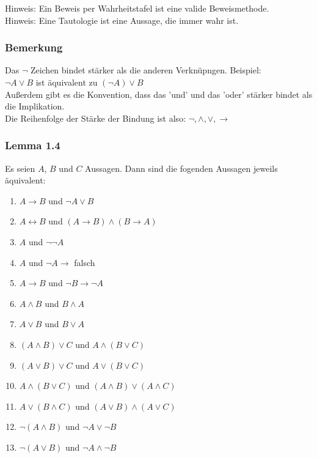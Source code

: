 \documentclass{article}
\begin{document}
Hinweis: Ein Beweis per Wahrheitstafel ist eine valide Beweismethode. \\
Hinweis: Eine Tautologie ist eine Aussage, die immer wahr ist. \\

\subsubsection*{Bemerkung}
Das $\neg$ Zeichen bindet stärker als die anderen Verknüpngen. Beispiel: \\
$\neg A \vee B$ ist äquivalent zu $(\neg A) \vee B$ \\
Außerdem gibt es die Konvention, dass das 'und' und das 'oder' stärker bindet als die Implikation. \\
Die Reihenfolge der Stärke der Bindung ist also: $\neg, \wedge, \vee, \rightarrow$ \\


\subsubsection*{Lemma 1.4}
Es seien $A$, $B$ und $C$ Aussagen. Dann sind die fogenden Aussagen jeweils äquivalent: \\
\begin{enumerate}
    \item $A \rightarrow B$ und $\neg A \vee B$
    \item $A \leftrightarrow B$ und $(A \rightarrow B) \wedge (B \rightarrow A)$
    \item $A$ und $\neg \neg A$
    \item $A$ und $\neg A \rightarrow $ falsch
    \item $A \rightarrow B$ und $\neg B \rightarrow \neg A$
    \item $A \wedge B$ und $B \wedge A$
    \item $A \vee B$ und $B \vee A$
    \item $(A \wedge B) \vee C$ und $A \wedge (B \vee C)$
    \item $(A \vee B) \vee C$ und $A \vee (B \vee C)$
    \item $A \wedge (B \vee C)$ und $(A \wedge B) \vee (A \wedge C)$
    \item $A \vee (B \wedge C)$ und $(A \vee B) \wedge (A \vee C)$
    \item $\neg (A \wedge B)$ und $\neg A \vee \neg B$
    \item $\neg (A \vee B)$ und $\neg A \wedge \neg B$
\end{enumerate}
\end{document}

